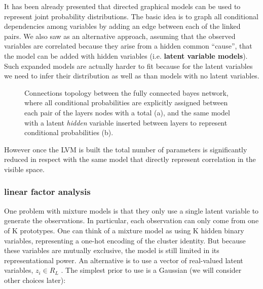 It has been already presented that directed graphical models can be used to represent joint probability distributions. The basic idea is to graph all conditional dependencies among variables by adding an edge between each of the linked pairs. 
We also saw as an alternative approach, assuming that the observed variables are correlated because they arise from a hidden common “cause”, that the model can be added with hidden variables (i.e. \textbf{latent variable models}).
Such expanded models are actually harder to fit because for the latent variables we need to infer their distribution as well as than models with no latent variables.
%
\begin{figure}
    \centering
    \caption{Connections topology between the fully connected bayes network, where all conditional probabilities are explicitly assigned between each pair of the layers nodes with a total  (a), and the same model with a latent \textit{hidden} variable inserted between layers to represent conditional probabilities (b). }
    \label{fig:mixture_models}
\end{figure}
%
However once the \acs{LVM} is built the total number of parameters is significantly reduced in respect with the same model that directly represent correlation in the visible space. 



\subsubsection{linear factor analysis}
\label{linear factor analysis}
One problem with mixture models is that they only use a single latent variable to generate the
observations. In particular, each observation can only come from one of K prototypes. One can
think of a mixture model as using K hidden binary variables, representing a one-hot encoding
of the cluster identity. But because these variables are mutually exclusive, the model is still
limited in its representational power.
An alternative is to use a vector of real-valued latent variables, $z_i \in R_L$ . The simplest prior
to use is a Gaussian (we will consider other choices later):

